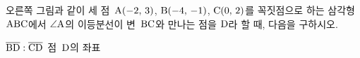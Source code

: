 \noindent\begin{minipage}[t]{0.58\linewidth}\vspace{0pt}오른쪽 그림과 같이 세 점~$\mathrm{A}(-2,\,3)$, $\mathrm{B}(-4,\,-1)$, $\mathrm{C}(0,\,2)$를 꼭짓점으로 하는 삼각형~$\mathrm{ABC}$에서 $\angle\mathrm{A}$의 이등분선이 변~$\mathrm{BC}$와 만나는 점을 $\mathrm{D}$라 할 때, 다음을 구하시오.\end{minipage}\hfill\begin{minipage}[t]{0.4\linewidth}\vspace{0pt}\centering \end{minipage}\par
{} $\overline{\mathrm{BD}}:\overline{\mathrm{CD}}$
 점~$\mathrm{D}$의 좌표
